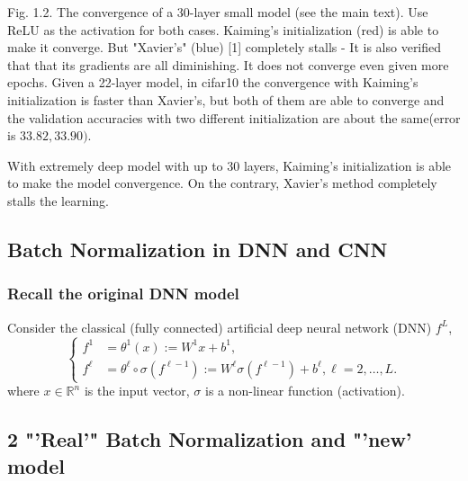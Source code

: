 \documentclass[10pt]{article}
\begin{document}
Fig. 1.2. The convergence of a 30-layer small model (see the main text). Use ReLU as the activation for both cases. Kaiming's initialization (red) is able to make it converge. But "Xavier's" (blue) [1] completely stalls - It is also verified that that its gradients are all diminishing. It does not converge even given more epochs. Given a 22-layer model, in cifar10 the convergence with Kaiming's initialization is faster than Xavier's, but both of them are able to converge and the validation accuracies with two different initialization are about the same(error is $33.82,33.90)$.

With extremely deep model with up to 30 layers, Kaiming's initialization is able to make the model convergence. On the contrary, Xavier's method completely stalls the learning.

\subsection{Batch Normalization in DNN and CNN}
\subsubsection{Recall the original DNN model}
Consider the classical (fully connected) artificial deep neural network (DNN) $f^{L}$,
$$
\begin{cases}f^{1} & =\theta^{1}(x):=W^{1} x+b^{1}, \\ f^{\ell} & =\theta^{\ell} \circ \sigma\left(f^{\ell-1}\right):=W^{\ell} \sigma\left(f^{\ell-1}\right)+b^{\ell}, \ell=2, \ldots, L .\end{cases}
$$
where $x \in \mathbb{R}^{n}$ is the input vector, $\sigma$ is a non-linear function (activation).

\subsection{2 "'Real'" Batch Normalization and "'new' model}
\end{document}
